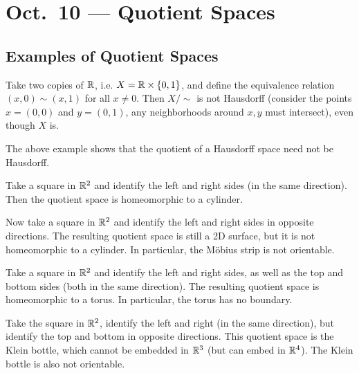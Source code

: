 \chapter{Oct.~10 --- Quotient Spaces}

\section{Examples of Quotient Spaces}

\begin{example}
  Take two copies of $\mathbb{R}$, i.e.
  $X = \mathbb{R} \times \{0, 1\}$,
  and define the equivalence relation
  $(x, 0) \sim (x, 1)$ for all $x \ne 0$. Then
  $X / {\sim}$ is not Hausdorff (consider
  the points $x = (0, 0)$ and $y = (0, 1)$, any
  neighborhoods around $x, y$ must intersect), even
  though $X$ is.
\end{example}

\begin{remark}
  The above example shows that the quotient of a
  Hausdorff space need not be Hausdorff.
\end{remark}

\begin{example}[Cylinder]
  Take a square in $\mathbb{R}^2$ and identify the
  left and right sides (in the same direction). Then
  the quotient space is homeomorphic to a cylinder.
\end{example}

\begin{example}
  Now take a square in $\mathbb{R}^2$ and identify the
  left and right sides in opposite directions. The
  resulting quotient space is still a 2D surface,
  but it is not homeomorphic to a cylinder. In
  particular, the M\"obius strip is not orientable.
\end{example}

\begin{example}[Torus]
  Take a square in $\mathbb{R}^2$ and identify the
  left and right sides, as well as the top and
  bottom sides (both in the same direction). The
  resulting quotient space is
  homeomorphic to a torus. In particular, the
  torus has no boundary.
\end{example}

\begin{example}
  Take the square in $\mathbb{R}^2$, identify the left
  and right (in the same direction), but identify
  the top and bottom in opposite directions. This
  quotient space is the Klein bottle, which cannot
  be embedded in $\mathbb{R}^3$ (but can embed in $\mathbb{R}^4$). The
  Klein bottle is also not orientable.
\end{example}

